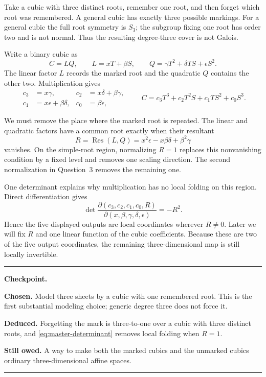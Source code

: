 \documentclass[11pt,a4paper]{article}
\numberwithin{equation}{section}
\theoremstyle{definition}
\theoremstyle{remark}
\DeclareMathOperator{\Res}{Res}
\newenvironment{modelanswer}
  {\par\smallskip\noindent{\color{modelgreen}\bfseries MODEL}\par\smallskip}
  {\par\medskip}
\newenvironment{checkpoint}
  {\par\smallskip\noindent\color{paperblue}\hrule\color{black}
   \vspace{0.55em}\noindent\begin{minipage}{\linewidth}\small
   \textbf{Checkpoint.}\par\smallskip}
  {\end{minipage}\vspace{0.45em}\color{paperblue}\hrule\color{black}
   \par\medskip}
\newcommand{\chosen}[1]{\textbf{Chosen.} #1\par\smallskip}
\newcommand{\deduced}[1]{\textbf{Deduced.} #1\par\smallskip}
\newcommand{\owed}[1]{\textbf{Still owed.} #1}
\begin{document}
\begin{modelanswer}
Take a cubic with three distinct roots, remember one root, and then forget
which root was remembered.  A general cubic has exactly three possible
markings.  For a general cubic the full root symmetry is \(S_3\); the subgroup
fixing one root has order two and is not normal.  Thus the resulting
degree-three cover is not Galois.

Write a binary cubic as
\[
  C=LQ,
  \qquad
  L=xT+\beta S,
  \qquad
  Q=\gamma T^2+\delta TS+\epsilon S^2.
\]
The linear factor \(L\) records the marked root and the quadratic \(Q\)
contains the other two.  Multiplication gives
\begin{equation}\label{eq:product}
\begin{aligned}
c_3&=x\gamma,&c_2&=x\delta+\beta\gamma,\\
c_1&=x\epsilon+\beta\delta,&c_0&=\beta\epsilon,
\end{aligned}
\qquad
C=c_3T^3+c_2T^2S+c_1TS^2+c_0S^3.
\end{equation}

We must remove the place where the marked root is repeated.  The linear and
quadratic factors have a common root exactly when their resultant
\begin{equation}\label{eq:resultant}
  R=\Res(L,Q)=x^2\epsilon-x\beta\delta+\beta^2\gamma
\end{equation}
vanishes.  On the simple-root region, normalizing \(R=1\) replaces this
nonvanishing condition by a fixed level and removes one scaling direction.
The second normalization in Question~3 removes the remaining one.

One determinant explains why multiplication has no local folding on this
region.  Direct differentiation gives
\begin{equation}\label{eq:master-determinant}
 \det\frac{\partial(c_3,c_2,c_1,c_0,R)}
 {\partial(x,\beta,\gamma,\delta,\epsilon)}=-R^2.
\end{equation}
Hence the five displayed outputs are local coordinates wherever \(R\ne0\).
Later we will fix \(R\) and one linear function of the cubic coefficients.
Because these are two of the five output coordinates, the remaining
three-dimensional map is still locally invertible.
\end{modelanswer}

\begin{checkpoint}
\chosen{Model three sheets by a cubic with one remembered root.  This is the
first substantial modeling choice; generic degree three does not force it.}
\deduced{Forgetting the mark is three-to-one over a cubic with three distinct
roots, and \eqref{eq:master-determinant} removes local folding when \(R=1\).}
\owed{A way to make both the marked cubics and the unmarked cubics ordinary
three-dimensional affine spaces.}
\end{checkpoint}
\end{document}
